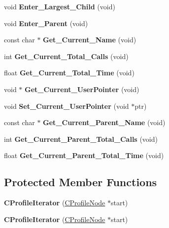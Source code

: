 \begin{DoxyCompactItemize}
void {\bfseries Enter\+\_\+\+Largest\+\_\+\+Child} (void)
\item 
\mbox{\label{classCProfileIterator_a81cce48c9b11334a5a23a7faa4f2c781}} 
void {\bfseries Enter\+\_\+\+Parent} (void)
\item 
\mbox{\label{classCProfileIterator_ad3fffc9d6e49b22c8996090487a2d35d}} 
const char $\ast$ {\bfseries Get\+\_\+\+Current\+\_\+\+Name} (void)
\item 
\mbox{\label{classCProfileIterator_a714cd183984d51bd5cbe1191fc810121}} 
int {\bfseries Get\+\_\+\+Current\+\_\+\+Total\+\_\+\+Calls} (void)
\item 
\mbox{\label{classCProfileIterator_ade475951031ec7c42ce6408271f99236}} 
float {\bfseries Get\+\_\+\+Current\+\_\+\+Total\+\_\+\+Time} (void)
\item 
\mbox{\label{classCProfileIterator_a2dd1ce5575126c0603a8da5f729f7cde}} 
void $\ast$ {\bfseries Get\+\_\+\+Current\+\_\+\+User\+Pointer} (void)
\item 
\mbox{\label{classCProfileIterator_a6873a85aab7876fd40a0789eec11b59a}} 
void {\bfseries Set\+\_\+\+Current\+\_\+\+User\+Pointer} (void $\ast$ptr)
\item 
\mbox{\label{classCProfileIterator_a8f39045cfbb406ed1b9cf1f57aac460b}} 
const char $\ast$ {\bfseries Get\+\_\+\+Current\+\_\+\+Parent\+\_\+\+Name} (void)
\item 
\mbox{\label{classCProfileIterator_a0d76e29528c64ef95de5e4fafd6cd711}} 
int {\bfseries Get\+\_\+\+Current\+\_\+\+Parent\+\_\+\+Total\+\_\+\+Calls} (void)
\item 
\mbox{\label{classCProfileIterator_a8c4aadfa90b81cf3161961f4e82dd2cc}} 
float {\bfseries Get\+\_\+\+Current\+\_\+\+Parent\+\_\+\+Total\+\_\+\+Time} (void)
\end{DoxyCompactItemize}
\subsection*{Protected Member Functions}
\begin{DoxyCompactItemize}
\item 
\mbox{\label{classCProfileIterator_aea53ee6b3b00e5b5e869625a78cc3783}} 
{\bfseries C\+Profile\+Iterator} (\hyperlink{classCProfileNode}{C\+Profile\+Node} $\ast$start)
\item 
\mbox{\label{classCProfileIterator_aea53ee6b3b00e5b5e869625a78cc3783}} 
{\bfseries C\+Profile\+Iterator} (\hyperlink{classCProfileNode}{C\+Profile\+Node} $\ast$start)
\end{DoxyCompactItemize}
